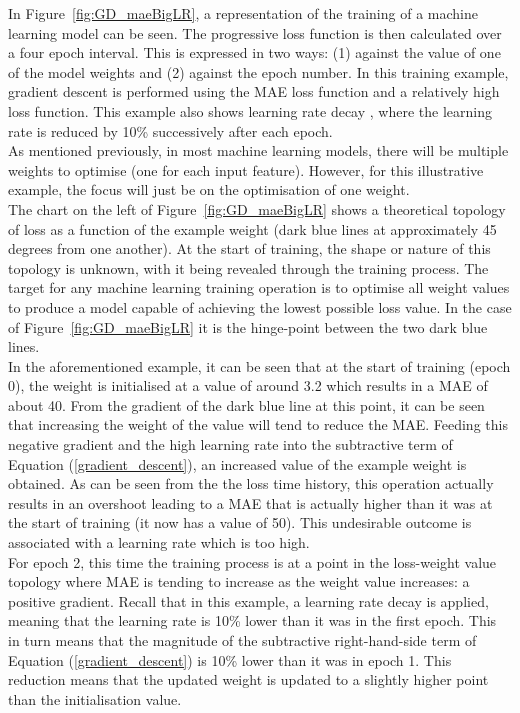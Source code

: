 \noindent
In Figure~\ref{fig:GD_maeBigLR}, a representation of the training of a machine learning model can be seen. The progressive loss function is then calculated over a four epoch interval. This is expressed in two ways: (1) against the value of one of the model weights and (2) against the epoch number.  In this training example, gradient descent is performed using the MAE loss function and a relatively high loss function. This example also shows learning rate decay \cite{lewkowycz2021decay}, where the learning rate is reduced by 10\% successively after each epoch. \\

\noindent 
As mentioned previously, in most machine learning models, there will be multiple weights to optimise (one for each input feature). However, for this illustrative example, the focus will just be on the optimisation of one weight.\\

\noindent
The chart on the left of Figure~\ref{fig:GD_maeBigLR} shows a theoretical topology of loss as a function of the example weight (dark blue lines at approximately 45 degrees from one another). At the start of training, the shape or nature of this topology is unknown, with it being revealed through the training process. The target for any machine learning training operation is to optimise all weight values to produce a model capable of achieving the lowest possible loss value. In the case of Figure~\ref{fig:GD_maeBigLR} it is the hinge-point between the two dark blue lines. \\

\noindent 
In the aforementioned example, it can be seen that at the start of training (epoch 0), the weight is initialised at a value of around 3.2 which results in a MAE of about 40. From the gradient of the dark blue line at this point, it can be seen that increasing the weight of the value will tend to reduce the MAE. Feeding this negative gradient and the high learning rate into the subtractive term of Equation (\ref{gradient_descent}), an increased value of the example weight is obtained. As can be seen from the the loss time history, this operation actually results in an overshoot leading to a MAE that is actually higher than it was at the start of training (it now has a value of 50). This undesirable outcome is associated with a learning rate which is too high. \\

\noindent
For epoch 2, this time the training process is at a point in the loss-weight value topology where MAE is tending to increase as the weight value increases: a positive gradient. Recall that in this example, a learning rate decay is applied, meaning that the learning rate is 10\% lower than it was in the first epoch. This in turn means that the magnitude of the subtractive right-hand-side term of Equation (\ref{gradient_descent}) is 10\% lower than it was in epoch 1. This reduction means that the updated weight is updated to a slightly higher point than the initialisation value. \\

